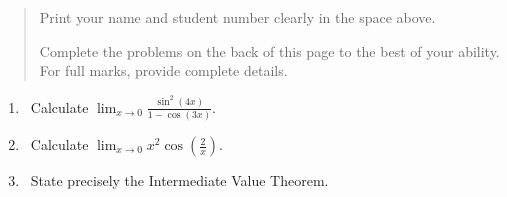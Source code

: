 \documentclass[12pt]{article}
\newcommand{\points}[1]{\marginpar{\hspace{24pt}[#1]}}
\newcommand{\di}{\displaystyle}
\begin{document}
\begin{quote}
Print your name and student number clearly in the space above. 

\medskip

Complete the problems on the back of this page to the best of your ability.
For full marks, provide complete details.

\medskip

\end{quote}
\newpage
\thispagestyle{empty}
\begin{enumerate}
 \item \,  Calculate  $\di \lim_{x \to 0 } \frac{\sin^2(4x)}{1-\cos(3x)}$.  \points{4}
% 
% 
%
%

 \vspace{8cm}
 
 \item     \,  Calculate  $\di \lim_{x \to 0 } x^2 \cos(\frac{2}{x})$.  \points{4}
 
 
 \vspace{9cm}
 
 \item \, State precisely the Intermediate Value Theorem. \points{2}
% 
% 
\end{enumerate}
\end{document}
